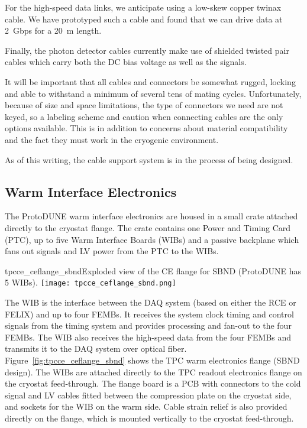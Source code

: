 For the high-speed data links, we anticipate using a low-skew copper twinax cable.
We have prototyped such a cable and found that we can drive data at 2~Gbps for a 20~m length.

Finally, the photon detector cables currently make use of shielded twisted pair cables which carry both
the DC bias voltage as well as the signals.

It will be important that all cables and connectors be somewhat rugged,
locking and able to withstand a minimum of several tens of mating cycles.
Unfortunately, because of size and space limitations, the type of connectors we need are not keyed,
so a labeling scheme and caution when connecting cables are the only options available.
This is in addition to concerns about material compatibility and the fact they must work in the cryogenic environment.

As of this writing, the cable support system is in the process of being designed.

\subsection{Warm Interface Electronics}
\label{subsec:warm_interface_elec}

The ProtoDUNE warm interface electronics are housed in a small crate
attached directly to the cryostat flange.  The crate contains one
Power and Timing Card (PTC), up to five Warm Interface Boards (WIBs) and a passive
backplane which fans out signals and LV power from the PTC to the WIBs.

\begin{cdrfigure}{tpcce_ceflange_sbnd}{Exploded view of 
the CE flange for SBND (ProtoDUNE has 5 WIBs).}
\texttt{[image: tpcce\_ceflange\_sbnd.png]}
\end{cdrfigure}

The WIB is the interface between the
DAQ system (based on either the RCE or FELIX) and up to four
FEMBs. It receives the system clock timing and control signals from the
timing system and provides processing and fan-out to the four
FEMBs. The WIB also receives the high-speed data from the four 
FEMBs and transmits it to the DAQ system over optical
fiber.  Figure~\ref{fig:tpcce_ceflange_sbnd} shows the TPC warm electronics
flange (SBND design). The WIBs are attached directly to the TPC
readout electronics flange on the cryostat feed-through. The flange
board is a PCB with connectors to the cold signal and LV cables fitted
between the compression plate on the cryostat side, and sockets for
the WIB on the warm side. Cable strain relief is also provided
directly on the flange, which is mounted vertically to the cryostat
feed-through.

